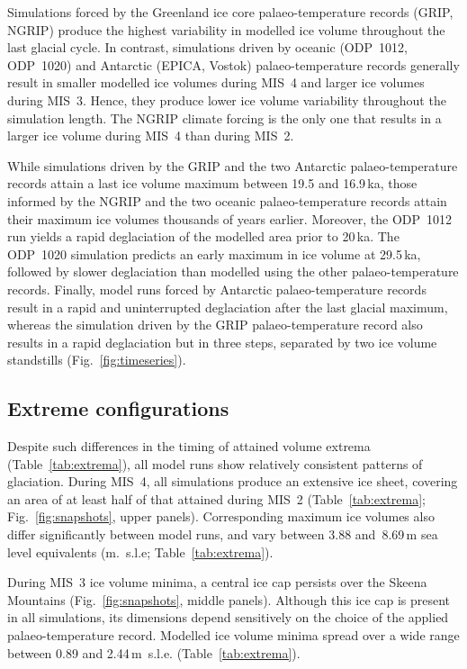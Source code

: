 \documentclass[tc]{copernicus}
\begin{document}
Simulations forced by the Greenland ice core palaeo-temperature
records (GRIP, NGRIP) produce the highest variability in modelled ice volume
throughout the last glacial cycle. In contrast, simulations driven by oceanic
(ODP~1012, ODP~1020) and Antarctic (EPICA, Vostok) palaeo-temperature records
generally result in smaller
modelled ice volumes during MIS~4 and larger ice volumes during MIS~3.
Hence, they produce lower ice volume variability
throughout the simulation length. The NGRIP climate forcing is the only one
that results in a larger ice volume during MIS~4 than during MIS~2.

While simulations driven by the GRIP and the two Antarctic palaeo-temperature
records attain a last ice volume maximum between 19.5 and 16.9\,ka, those
informed by the NGRIP and the two oceanic palaeo-temperature records attain their
maximum ice volumes thousands of years earlier. Moreover, the ODP~1012 run
yields a rapid deglaciation of the modelled area prior to 20\,ka. The ODP~1020
simulation predicts an early maximum in ice volume at 29.5\,ka, followed by
slower deglaciation than modelled using the other palaeo-temperature records.
Finally, model runs forced by Antarctic palaeo-temperature records result in a
rapid and uninterrupted deglaciation after the last glacial maximum, whereas the
simulation driven by the GRIP palaeo-temperature record also results in a rapid
deglaciation but in three steps, separated by two ice volume standstills
(Fig.~\ref{fig:timeseries}).

\subsection{Extreme configurations}

Despite such differences in the timing of attained volume extrema
(Table~\ref{tab:extrema}), all model runs show relatively consistent
patterns of glaciation. During MIS~4, all simulations produce an extensive ice
sheet, covering an area of at least half of that attained during MIS~2
(Table~\ref{tab:extrema}; Fig.~\ref{fig:snapshots}, upper panels).
Corresponding maximum ice volumes also differ significantly between model runs,
and vary between 3.88 and~8.69\,m sea level equivalents (m.~s.l.e;
Table~\ref{tab:extrema}).

During MIS~3 ice volume minima, a central ice cap persists over the Skeena
Mountains (Fig.~\ref{fig:snapshots}, middle panels). Although this ice cap is
present in all simulations, its dimensions depend sensitively on the choice of
the applied palaeo-temperature record. Modelled ice volume minima spread over a
wide range between 0.89 and 2.44\,m~s.l.e. (Table~\ref{tab:extrema}).
\end{document}
